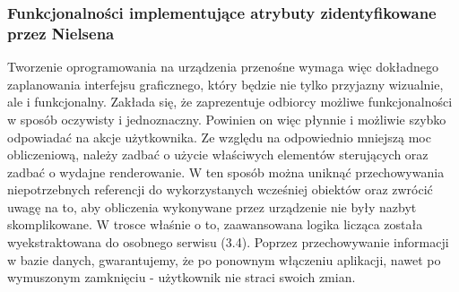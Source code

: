  \subsubsection{Funkcjonalności implementujące atrybuty zidentyfikowane przez Nielsena}
 Tworzenie oprogramowania na urządzenia przenośne wymaga więc dokładnego zaplanowania interfejsu graficznego, który będzie nie tylko przyjazny wizualnie, ale i funkcjonalny. Zakłada się, że zaprezentuje odbiorcy możliwe funkcjonalności w sposób oczywisty i jednoznaczny. Powinien on więc płynnie i możliwie szybko odpowiadać na akcje użytkownika. Ze względu na odpowiednio mniejszą moc obliczeniową, należy zadbać o użycie właściwych elementów sterujących oraz zadbać o wydajne renderowanie. W ten sposób można uniknąć przechowywania niepotrzebnych referencji do wykorzystanych wcześniej obiektów oraz zwrócić uwagę na to, aby obliczenia wykonywane przez urządzenie nie były nazbyt skomplikowane. W trosce właśnie o to, zaawansowana logika licząca została wyekstraktowana do osobnego serwisu (3.4). Poprzez przechowywanie informacji w bazie danych, gwarantujemy, że po ponownym włączeniu aplikacji, nawet po wymuszonym zamknięciu - użytkownik nie straci swoich zmian.